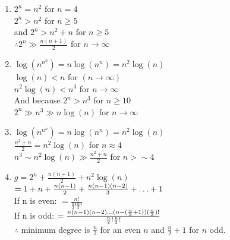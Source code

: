\documentclass[11pt]{amsart}
\newcommand{\be}{\begin{enumerate}}
\newcommand{\ee}{\end{enumerate}}
\begin{document}
		\begin{sol}
			\be
				\item
				$2^n = n^2$ for $n=4$\\
				$2^n > n^2$ for $n\geq5$\\
				and $2^n > n^2+n$ for $n\geq5$\\
				$\therefore 2^n \gg \frac{n(n+1)}{2}$ for $n \rightarrow \infty$

				\item
				$\log(n^{n^n}) = n\log(n^n) = n^2\log(n)$\\
				$\log(n) < n$ for $(n \rightarrow \infty)$\\
				$n^2\log(n) < n^3$ for $n \rightarrow \infty$\\
				And because $2^n > n^3$ for $n \geq 10$\\
				$2^n \gg n^3 \gg n\log(n)$ for $n \rightarrow \infty$

				\item
				$\log(n^{n^n}) = n\log(n^n) = n^2\log(n)$\\
				$\frac{n^2+n}{2} = n^2\log(n)$ for $n \approx 4$\\
				$n^3 \sim n^2\log(n) \gg \frac{n^2+n}{2}$ for $n > \sim4$

				\item
				$g = 2^n + \frac{n(n+1)}{2} + n^2\log(n)$\\
				$= 1 + n + \frac{n(n-1)}{2} + \frac{n(n-1)(n-2)}{3} + \mathellipsis+1$\\
				If n is even: $= \frac{n!}{\frac{n}{2}!\frac{n}{2}!}$\\
				If n is odd: $= \frac{n(n-1)(n-2)\mathellipsis(n-(\frac{n}{2} + 1)) (\frac{n}{2})!}{\frac{n}{2}!\frac{n}{2}!}$\\
				$\therefore$ minimum degree is $\frac{n}{2}$ for an even $n$ and $\frac{n}{2} + 1$ for $n$ odd.
			\ee
		\end{sol}
\end{document}
